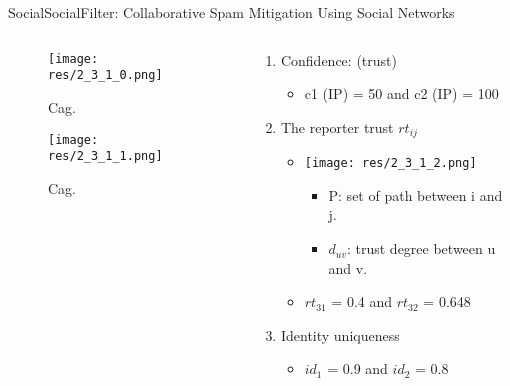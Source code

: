 \begin{frame}{Social}{{SocialFilter}: Collaborative Spam Mitigation Using Social Networks \cite{yang_socialfilter_2009}}

	\begin{columns}
		\begin{column}{0.55\textwidth}
			\begin{center}
			
				\begin{figure}
					\texttt{[image: res/2\_3\_1\_0.png]}
					\caption{\label{fig:2_3_1_0}Cag.}
				\end{figure}
				
				\begin{figure}
					\texttt{[image: res/2\_3\_1\_1.png]}
					\caption{\label{fig:2_3_1_1}Cag.}
				\end{figure}
				
			\end{center}
		\end{column}
		
		\begin{column}{0.45\textwidth}
		
			\begin{enumerate}
			
				\item Confidence: (trust)
					\begin{itemize}
						\item c1 (IP) = 50  and c2 (IP) = 100%
					\end{itemize}
					

				\item The reporter trust $rt_{ij}$
					\begin{itemize}
						\item \texttt{[image: res/2\_3\_1\_2.png]}
							\begin{itemize}
								\item P: set of path between i and j.
								\item $d_{uv}$: trust degree between u and v.
							\end{itemize}
						\item $rt_{31}$ = 0.4 and  $rt_{32}$ = 0.648
					\end{itemize}
					
				\item Identity uniqueness
					\begin{itemize}
						\item $id_{1}$ = 0.9 and $id_{2}$ = 0.8
					\end{itemize}
					
			\end{enumerate}
		\end{column}
	\end{columns}

\end{frame}

